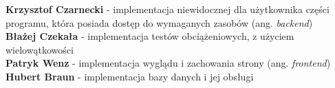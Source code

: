 
   \large
{
\textbf{Krzysztof Czarnecki}  - implementacja niewidocznej dla użytkownika części programu, która posiada dostęp do wymaganych zasobów (ang. \textit{backend}) \\
\textbf{Błażej Czekała} - implementacja testów obciążeniowych, z użyciem wielowątkowości\\
\textbf{Patryk Wenz} - implementacja wyglądu i zachowania strony (ang. \textit{frontend})\\
\textbf{Hubert Braun} - implementacja bazy danych i jej obsługi
} 